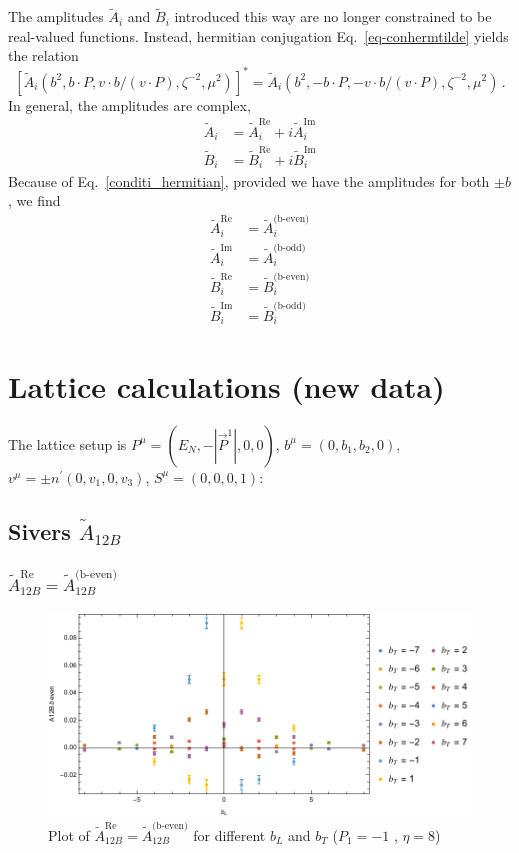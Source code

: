 \documentclass[]{article}
\numberwithin{equation}{section}
\newcommand{\tcdot}{{\cdot}}
\newcommand{\tAmp}{\widetilde{A}}
\newcommand{\tBmp}{\widetilde{B}}
\newcommand{\tAmp}{\ensuremath{\widetilde{A}^{(+)}}}
\newcommand{\tBmp}{\ensuremath{\widetilde{B}^{(+)}}}
\newcommand{\elll}{b}
\begin{document}
The amplitudes $\tAmp_i$ and $\tBmp_i$ introduced this way are no longer constrained to be real-valued functions. Instead, hermitian conjugation Eq.\ \eqref{eq-conhermtilde} yields the relation
\begin{equation}
	\left[ \tAmp_i(\elll^2,\elll \tcdot P, v \tcdot \elll / (v \tcdot P), \zeta^{-2},\mu^2) \right]^* = \tAmp_i(\elll^2,-\elll \tcdot P, -v \tcdot \elll / (v \tcdot P), \zeta^{-2},\mu^2)\, .\label{conditi_hermitian}
\end{equation}
In general, the amplitudes are complex,
\begin{align}
    \tilde{A}_i&=\tilde{A}^{\text{Re}}_i+i\tilde{A}^{\text{Im}}_i\\
    \tilde{B}_i&=\tilde{B}^{\text{Re}}_i+i\tilde{B}^{\text{Im}}_i
\end{align}
Because of Eq.\ \eqref{conditi_hermitian}, provided we have the amplitudes for both $\pm b$, we find
\begin{align}
    \tilde{A}^{\text{Re}}_i&=\tilde{A}^{\text{(b-even)}}_i\\
    \tilde{A}^{\text{Im}}_i&=\tilde{A}^{\text{(b-odd})}_i\\
    \tilde{B}^{\text{Re}}_i&=\tilde{B}^{\text{(b-even)}}_i\\
    \tilde{B}^{\text{Im}}_i&=\tilde{B}^{\text{(b-odd})}_i
\end{align}

\pagebreak
\section{Lattice calculations (new data)}
The lattice setup is $P^{\mu}=(E_N, -|\vec{P}^1|,0,0)$, $b^{\mu}=(0,b_{1},b_{2},0)$, $v^{\mu}=\pm n^{\prime}(0,v_{1},0,v_{3})$, $S^{\mu}=(0,0,0,1)$:
\subsection{Sivers $\tAmp_{12B}$}
\subsubsection{$\tAmp^{\text{Re}}_{12B}=\tAmp^{\text{(b-even)}}_{12B}$}
\begin{figure}[h!]
    \centering
    \includegraphics[width=0.45\linewidth]{bLbT_A12B_b_even_P1_-1_eta_8.pdf}
    \caption{Plot of  $\tAmp^{\text{Re}}_{12B}=\tAmp^{\text{(b-even)}}_{12B}$ for different $b_{L}$ and $b_{T}$  ($P_{1} = -1$ , $\eta=8$)}
\end{figure}
\end{document}
